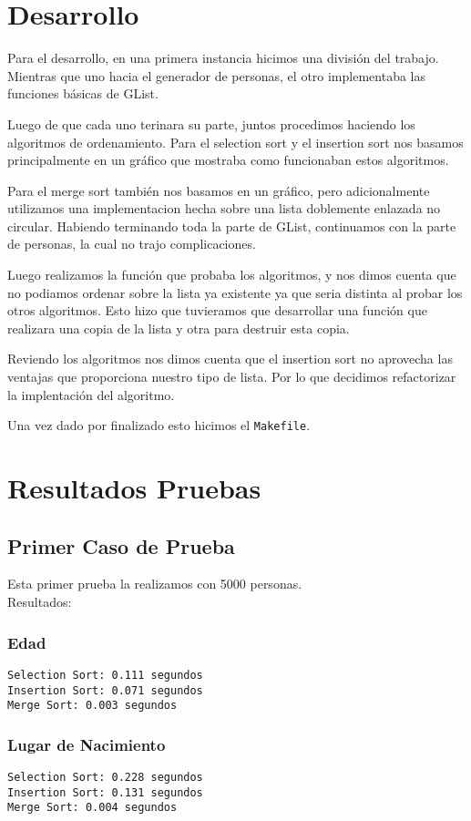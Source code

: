 \documentclass[]{article}
\begin{document}
\section{Desarrollo}
Para el desarrollo, en una primera instancia hicimos una división del trabajo. Mientras que uno hacia el generador de personas, el otro implementaba las funciones básicas de GList.

Luego de que cada uno terinara su parte, juntos procedimos haciendo los algoritmos de ordenamiento.
Para el selection sort y el insertion sort nos basamos principalmente en un gráfico que mostraba como funcionaban estos algoritmos.

Para el merge sort también nos basamos en un gráfico, pero adicionalmente utilizamos una implementacion hecha sobre una lista doblemente enlazada no circular.
Habiendo terminando toda la parte de GList, continuamos con la parte de personas, la cual no trajo complicaciones.

Luego realizamos la función que probaba los algoritmos, y nos dimos cuenta que no podiamos ordenar sobre la lista ya existente ya que seria distinta al probar los otros algoritmos. Esto hizo que tuvieramos que desarrollar una función que realizara una copia de la lista y otra para destruir esta copia.

Reviendo los algoritmos nos dimos cuenta que el insertion sort no aprovecha las ventajas que proporciona nuestro tipo de lista. Por lo que decidimos refactorizar la implentación del algoritmo.

Una vez dado por finalizado esto hicimos el \verb|Makefile|.
\newpage
\section{Resultados Pruebas}
\subsection{Primer Caso de Prueba}
Esta primer prueba la realizamos con 5000 personas.\\
Resultados:

\subsubsection{Edad}
\verb|Selection Sort: 0.111 segundos|\\
\verb|Insertion Sort: 0.071 segundos|\\
\verb|Merge Sort: 0.003 segundos|\\
\subsubsection{Lugar de Nacimiento}
\verb|Selection Sort: 0.228 segundos|\\
\verb|Insertion Sort: 0.131 segundos|\\
\verb|Merge Sort: 0.004 segundos|\\
\end{document}
